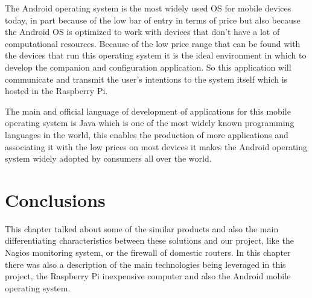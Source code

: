 The Android operating system is the most widely used OS for mobile devices
today, in part because of the low bar of entry in terms of price but also
because the Android OS is optimized to work with devices that don't have a lot
of computational resources. Because of the low price range that can be found
with the devices that run this operating system it is the ideal environment in
which to develop the companion and configuration application. So this
application will communicate and transmit the user's intentions to the system
itself which is hosted in the Raspberry Pi.

The main and official language of development of applications for this mobile
operating system is Java which is one of the most widely known programming
languages in the world, this enables the production of more applications and
associating it with the low prices on most devices it makes the Android
operating system widely adopted by consumers all over the world.


\section{Conclusions}
\label{chap2:sec:concs}
This chapter talked about some of the similar products and also the main
differentiating characteristics between these solutions and our project, like
the Nagios monitoring system, or the firewall of domestic routers.
In this chapter there was also a description of the main technologies being
leveraged in this project, the Raspberry Pi inexpensive computer and also the
Android mobile operating system.
